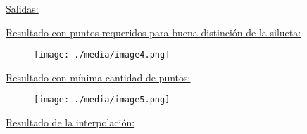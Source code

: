 \documentclass[12pt]{article}
\renewcommand{\_}{\kern-1.5pt\textunderscore\kern-1.5pt}
\begin{document}
\begin{adjustwidth}{0.5in}{0.0in}
\begin{justify}
\uline{Salidas:}
\end{justify}\par

\end{adjustwidth}


\vspace{\baselineskip}
\begin{justify}
\uline{Resultado con puntos requeridos para buena distinción de la silueta:}
\end{justify}\par


\vspace{\baselineskip}



\begin{figure}[H]
	\begin{Center}
		\texttt{[image: ./media/image4.png]}
	\end{Center}
\end{figure}



\par

\begin{justify}
\uline{Resultado con mínima cantidad de puntos:}
\end{justify}\par




\begin{figure}[H]
	\begin{Center}
		\texttt{[image: ./media/image5.png]}
	\end{Center}
\end{figure}



\par


\vspace{\baselineskip}
\begin{justify}
\uline{Resultado de la interpolación:}
\end{justify}\par
\end{document}
